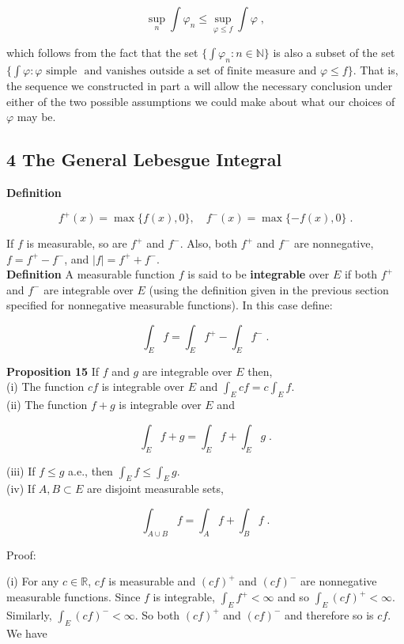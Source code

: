 \documentclass[a4paper]{article}
\begin{document}
$$\sup_n \int \varphi_n \leq \sup_{\varphi \leq f} \int \varphi \;,$$

which follows from the fact that the set $\{\int \varphi_n : n \in \mathbb{N}\}$ is also a subset of the set $\{\int \varphi : \varphi \text{ simple } $ $\text{and vanishes outside a set of finite measure and } \varphi \leq f\}$. That is, the sequence we constructed in part a will allow the necessary conclusion under either of the two possible assumptions we could make about what our choices of $\varphi$ may be. 


\subsection*{4 The General Lebesgue Integral}

{\bf Definition} 

$$f^+(x) = \max \{f(x), 0\}, \quad f^-(x) = \max \{-f(x), 0\} \;.$$

If $f$ is measurable, so are $f^+$ and $f^-$. Also, both $f^+$ and $f^-$ are nonnegative, $f = f^+ - f^-$, and $|f| = f^+ + f^-$. \\

{\bf Definition} A measurable function $f$ is said to be {\bf integrable} over $E$ if both $f^+$ and $f^-$ are integrable over $E$ (using the definition given in the previous section specified for nonnegative measurable functions). In this case define:

$$\int_E f = \int_E f^+ - \int_E f^- \;.$$

{\bf Proposition 15} If $f$ and $g$ are integrable over $E$ then,\\

(i) The function $cf$ is integrable over $E$ and $\int_E cf = c \int_E f$. \\

(ii) The function $f+g$ is integrable over $E$ and 

$$\int_E f+g = \int_E f + \int_E g \;.$$

(iii) If $f\leq g$ a.e., then $\int_E f \leq \int_E g$. \\

(iv) If $A, B \subset E$ are disjoint measurable sets,

$$\int_{A\cup B} f = \int_A f + \int_B f \;.$$

Proof:

(i) For any $c \in \mathbb{R}$, $cf$ is measurable and $(cf)^+$ and $(cf)^-$ are nonnegative measurable functions. Since $f$ is integrable, $\int_E f^+ < \infty$ and so $\int_E (cf)^+ < \infty$. Similarly, $\int_E (cf)^- < \infty$. So both $(cf)^+$ and $(cf)^-$ and therefore so is $cf$. We have
\end{document}
